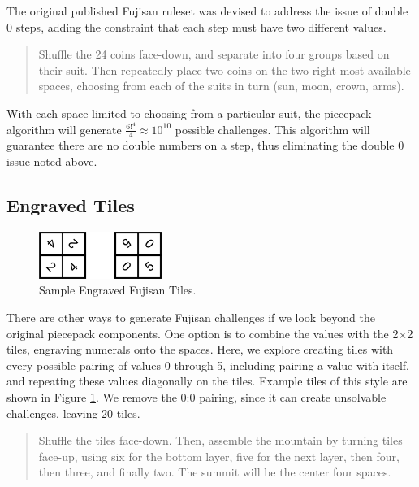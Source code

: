 \documentclass[10pt,journal,compsoc]{IEEEtran}
\begin{document}
The original published Fujisan ruleset was devised to address the issue of double 0 steps, adding the constraint that each step must have two different values.

\begin{quote}
    
  Shuffle the 24 coins face-down, and separate into four groups based on their suit. Then repeatedly place two coins on the two right-most available spaces, choosing from each of the suits in turn (sun, moon, crown, arms).
\end{quote}


With each space limited to choosing from a particular suit, the piecepack algorithm will generate $\frac{6!^4}{4} \approx 10^{10}$ possible challenges. 
This algorithm will guarantee there are no double numbers on a step, thus eliminating the double 0 issue noted above. 

\subsection{Engraved Tiles}

\begin{figure}[t]
\centering
\includegraphics[width=4cm]{engravedsample.png}
\caption{Sample Engraved Fujisan Tiles.}
\label{fig:engravedsample}
\end{figure}


There are other ways to generate Fujisan challenges if we look beyond the original piecepack components. One option is to combine the values with the 2$\times$2 tiles, engraving
numerals onto the spaces. Here, we explore creating tiles with every possible pairing of values 0 through 5, including pairing a value with itself, and repeating these values diagonally on the tiles. Example tiles of this style are shown in Figure \ref{fig:engravedsample}. We remove the 0:0 pairing, since it can create unsolvable challenges, leaving 20 tiles.

\begin{quote}
    
  Shuffle the tiles face-down. Then, assemble the mountain by turning tiles face-up, using six for the bottom layer, five for the next layer, then four, then three, and finally two. The summit will be the center four spaces.
\end{quote}
\end{document}

